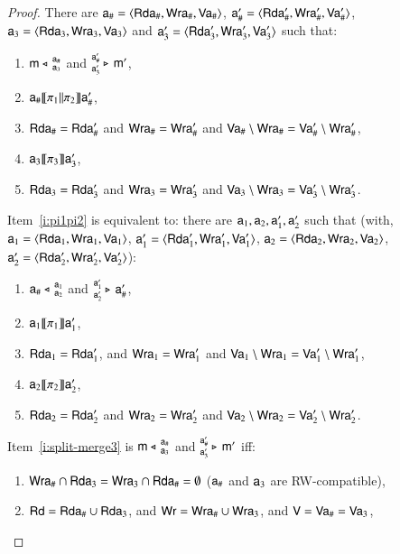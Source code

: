 \documentclass{llncs}
\newcommand{\modl}{\mathsf m}
\newcommand{\mrg}[3]{ ^{#2}_{#3} \triangleright \, #1 }
\newcommand{\pll}{ {||} }							%
\newcommand{\splt}[3]{ #1 \triangleleft \, ^{#2}_{#3} }
\newcommand{\readset}{\mathsf{Rd}}
\newcommand{\valuset}{\mathsf{V}}
\newcommand{\writeset}{\mathsf{Wr}}
\newcommand{\intPgm}[1]{\llbracket #1 \rrbracket}
\newcommand{\tuple}[1]{ \langle #1 \rangle}
\begin{document}
\begin{proof}
There are %
$\modla_\# = \tuple{\readseta_\#, \writeseta_\#, \valuseta_\#}$, $\modla'_\# = \tuple{\readseta'_\#, \writeseta'_\#, \valuseta'_\#}$, $\modla_3 = \tuple{\readseta_3, \writeseta_3, \valuseta_3}$ and $\modla'_3 = \tuple{\readseta'_3, \writeseta'_3, \valuseta'_3}$
such that:
\begin{enumerate}[resume]
\item\label{i:split-merge3}\label{i:rhsfirst} $\splt{\modl}{\modla_\#} {\modla_3}$
  and $\mrg{\modl'}{\modla'_\#} {\modla'_3}$, 
\item\label{i:pi1pi2} $\modla_\# \intPgm{ \pi_1 \pll \pi_2} \modla'_\#$,
\item $\mathsf {Rda}_\# = \mathsf {Rda}'_\#$
  and $\mathsf {Wra}_\# = \mathsf {Wra}'_\#$
  and $\mathsf {Va}_\# \setminus \mathsf {Wra}_\# = \mathsf {Va}'_\# \setminus \mathsf {Wra}'_\#$,
\item $\modla_3 \intPgm{ \pi_3 } \modla'_3$, 
\item $\mathsf {Rda}_3 = \mathsf {Rda}'_3$
  and $\mathsf {Wra}_3 = \mathsf {Wra}'_3$ 
  and $\mathsf {Va}_3 \setminus \mathsf {Wra}_3 = \mathsf {Va}'_3 \setminus \mathsf {Wra}'_3$.
\end{enumerate}
Item~\ref{i:pi1pi2} is equivalent to:
there are $\mathsf a_1, \mathsf a_2, \mathsf a'_1, \mathsf a'_2$ such that 
(with, $\modla_1 = \tuple{\readseta_1, \writeseta_1, \valuseta_1}$, $\modla'_1 = \tuple{\readseta'_1, \writeseta'_1, \valuseta'_1}$, $\modla_2 = \tuple{\readseta_2, \writeseta_2, \valuseta_2}$, $\modla'_2 = \tuple{\readseta'_2, \writeseta'_2, \valuseta'_2}$):
\begin{enumerate}[resume]
\item\label{i:split-merge4} $\splt{\modla_\#}{\modla_1} {\modla_2}$
  and $\mrg{\modla'_\#}{\modla'_1} {\modla'_2}$, 
\item $\modla_1 \intPgm{ \pi_1} \modla'_1$,
\item $\mathsf {Rda}_1 = \mathsf {Rda}'_1$,
  and $\mathsf {Wra}_1 = \mathsf {Wra}'_1$
  and $\mathsf {Va}_1 \setminus \mathsf {Wra}_1 = \mathsf {Va}'_1 \setminus \mathsf {Wra}'_1$,
\item $\modla_2 \intPgm{ \pi_2 } \modla'_2$, 
\item $\mathsf {Rda}_2 = \mathsf {Rda}'_2$
  and $\mathsf {Wra}_2 = \mathsf {Wra}'_2$ 
  and $\mathsf {Va}_2 \setminus \mathsf {Wra}_2 = \mathsf {Va}'_2 \setminus \mathsf {Wra}'_2$.
\end{enumerate}
Item~\ref{i:split-merge3} is $\splt{\modl}{\modla_\#} {\modla_3}$ and $\mrg{\modl'}{\modla'_\#} {\modla'_3}$ iff:
\begin{enumerate}[resume]
\item
  $\mathsf {Wra}_\# \cap \mathsf {Rda}_3 = \mathsf {Wra}_3 \cap \mathsf {Rda}_\# = \emptyset$ ($\mathsf a_\#$ and $\mathsf a_3$ are RW-compatible),
  \item 
    $\readset = \readseta_\# \cup \readseta_3 $, and $\writeset = \writeseta_\# \cup \writeseta_3$, and $\valuset = \valuseta_\# = \valuseta_3$,


\end{enumerate}
\end{proof}
\end{document}
